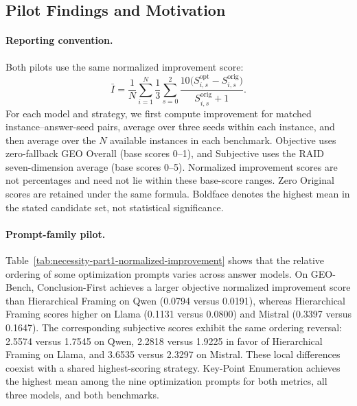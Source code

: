 \subsection{Pilot Findings and Motivation}
\label{sec:pilot-findings}

\paragraph{Reporting convention.}
Both pilots use the same normalized improvement score:
\begin{equation}
  \bar I = \frac{1}{N}\sum_{i=1}^{N}\frac{1}{3}\sum_{s=0}^{2}
  \frac{10\bigl(S^{\mathrm{opt}}_{i,s}-S^{\mathrm{orig}}_{i,s}\bigr)}
       {S^{\mathrm{orig}}_{i,s}+1}.
  \label{eq:pilot-normalized-improvement}
\end{equation}
For each model and strategy, we first compute improvement for matched
instance--answer-seed pairs, average over three seeds within each instance,
and then average over the $N$ available instances in each benchmark.
Objective uses zero-fallback GEO Overall (base scores 0--1), and Subjective
uses the RAID seven-dimension average (base scores 0--5).
Normalized improvement scores are not percentages and need not lie within
these base-score ranges. Zero Original scores are retained under the same
formula. Boldface denotes the highest mean in the stated candidate set,
not statistical significance.

\paragraph{Prompt-family pilot.}
Table~\ref{tab:necessity-part1-normalized-improvement}
shows that the relative ordering of some optimization prompts varies across
answer models. On GEO-Bench, Conclusion-First achieves a larger objective
normalized improvement score than Hierarchical Framing on Qwen
(0.0794 versus 0.0191), whereas Hierarchical Framing scores higher on
Llama (0.1131 versus 0.0800) and Mistral (0.3397 versus 0.1647).
The corresponding subjective scores exhibit the same ordering reversal:
2.5574 versus 1.7545 on Qwen, 2.2818 versus 1.9225 in favor of
Hierarchical Framing on Llama, and 3.6535 versus 2.3297 on Mistral.
These local differences coexist with a shared highest-scoring strategy.
Key-Point Enumeration achieves the highest mean among the nine optimization
prompts for both metrics, all three models, and both benchmarks.

